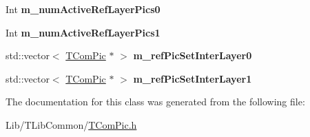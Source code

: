 \begin{DoxyCompactItemize}
Int {\bfseries m\+\_\+num\+Active\+Ref\+Layer\+Pics0}
\item 
\mbox{\label{class_t_com_decoded_rps_aee5e3a6e7d44c28cd85edca607d88728}} 
Int {\bfseries m\+\_\+num\+Active\+Ref\+Layer\+Pics1}
\item 
\mbox{\label{class_t_com_decoded_rps_a2e9a6c82d44e17203a2e93bea737a7ad}} 
std\+::vector$<$ \hyperlink{class_t_com_pic}{T\+Com\+Pic} $\ast$ $>$ {\bfseries m\+\_\+ref\+Pic\+Set\+Inter\+Layer0}
\item 
\mbox{\label{class_t_com_decoded_rps_abf41258297fe9d966590c5d1f94c5a39}} 
std\+::vector$<$ \hyperlink{class_t_com_pic}{T\+Com\+Pic} $\ast$ $>$ {\bfseries m\+\_\+ref\+Pic\+Set\+Inter\+Layer1}
\end{DoxyCompactItemize}


The documentation for this class was generated from the following file\+:\begin{DoxyCompactItemize}
\item 
Lib/\+T\+Lib\+Common/\hyperlink{_t_com_pic_8h}{T\+Com\+Pic.\+h}\end{DoxyCompactItemize}
